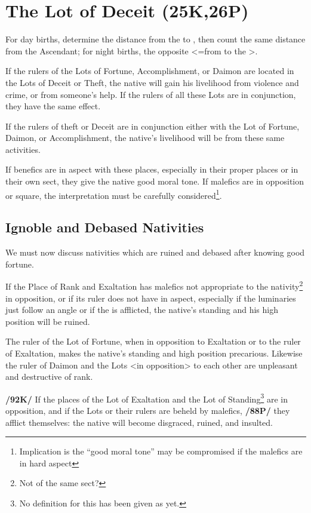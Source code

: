 \section{The Lot of Deceit (25K,26P)}

For day births, determine the distance from the \Sun\xspace to \Mars, then count the same distance from the Ascendant; for night births, the opposite <=from \Mars\xspace to the \Sun>. 

If the rulers of the Lots of Fortune, Accomplishment, or Daimon are located in the Lots of Deceit or Theft, the native will gain his livelihood from violence and crime, or from someone’s help. If the rulers of all these Lots are in conjunction, they
have the same effect. 

If the rulers of theft or Deceit are in conjunction either with the Lot of Fortune, Daimon, or Accomplishment, the native’s livelihood will be from these same activities. 

If benefics are in aspect with these places, especially in their proper places or in their own sect, they give the native good moral tone. \mndl If malefics are in opposition or square, the interpretation must be carefully considered\footnote{Implication is the ``good moral tone'' may be compromised if the malefics are in hard aspect}.

\subsection{\textlangle Ignoble and Debased Nativities\textrangle}
We must now discuss nativities which are ruined and debased after knowing good fortune. 

If the Place of Rank and Exaltation has malefics not appropriate to the nativity\footnote{Not of the same sect?} in opposition, or if its ruler does not have \Jupiter\xspace in aspect, especially if the luminaries just follow an angle or if the \Moon\xspace is afflicted, the native’s standing and his high position will be ruined. 

The ruler of the Lot of Fortune, when in opposition to Exaltation or to the ruler of Exaltation, makes the native’s standing and high position precarious. Likewise the ruler of Daimon and the Lots <in opposition> to each other are unpleasant and destructive of rank.

\textbf{/92K/} If the places of the Lot of Exaltation and the Lot of Standing\footnote{No definition for this has been given as yet.} are in opposition, and if the Lots or
their rulers are beheld by malefics, \textbf{/88P/} they afflict themselves: the native will become disgraced, ruined, and insulted. 

